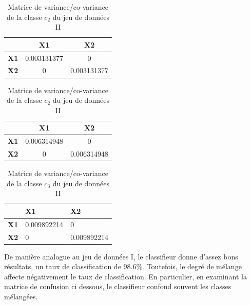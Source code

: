 	\begin{table}[ht]
		\begin{minipage}[b]{0.45\linewidth}\centering
			\begin{tabular}{|c|c|c|}
				\hline
				\textbf{}   & \textbf{X1}  & \textbf{X2}  \\ \hline
				\textbf{X1} & 0.003131377 & 0            \\ \hline
				\textbf{X2} & 0            & 0.003131377 \\ \hline
			\end{tabular}
			\caption{Matrice de variance/co-variance de la classe $c_1$ du jeu de données II}
			\label{tab:var_c12}
		\end{minipage}
		\hspace{0.5cm}
		\begin{minipage}[b]{0.45\linewidth}
			\centering
			\begin{tabular}{|c|c|c|}
				\hline
				\textbf{}   & \textbf{X1}  & \textbf{X2}  \\ \hline
				\textbf{X1} & 0.006314948 & 0            \\ \hline
				\textbf{X2} & 0            & 0.006314948 \\ \hline
			\end{tabular}
			\caption{Matrice de variance/co-variance de la classe $c_2$ du jeu de données II}
			\label{tab:var_c22}
		\end{minipage}
	\end{table}
	\begin{table}[H]
		\centering
		\begin{tabular}{|l|l|l|}
			\hline
			\textbf{}   & \textbf{X1}  & \textbf{X2}  \\ \hline
			\textbf{X1} & 0.009892214 & 0            \\ \hline
			\textbf{X2} & 0            & 0.009892214 \\ \hline
		\end{tabular}
		\caption{Matrice de variance/co-variance de la classe $c_3$ du jeu de données II}
		\label{tab:var_c32}
	\end{table}
	\par
	De manière analogue au jeu de données I, le classifieur donne d'assez bons résultats, un taux de classification de $98.6\%$. Toutefois, le degré de mélange affecte négativement le taux de classification. En particulier, en examinant la matrice de confusion ci dessous, le classifieur confond souvent les classes mélangées.
	

